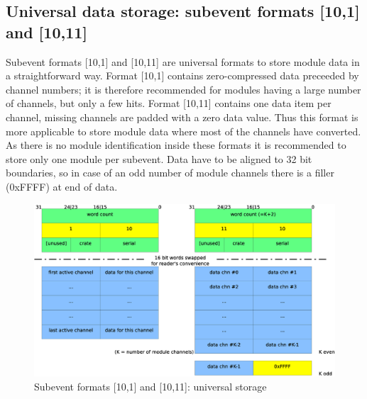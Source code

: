\documentclass[10pt]{article}
\begin{document}
\subsection{Universal data storage: subevent formats [10,1] and [10,11]}
Subevent formats [10,1] and [10,11] are universal formats to store module data in a straightforward way.
Format [10,1] contains zero-compressed data preceeded by channel numbers; it is therefore recommended for
modules having a large number of channels, but only a few hits. Format [10,11] contains one data item per channel,
missing channels are padded with a zero data value. Thus this format is more applicable to store module data
where most of the channels have converted. As there is no module identification inside these formats
it is recommended to store only one module per subevent. Data have to be aligned to 32 bit boundaries, so in case of
an odd number of module channels there is a filler (0xFFFF) at end of data.
\begin{figure}[H]
\centerline{\includegraphics[width=\linewidth]{MedSevt_10_1_11}}
\caption{Subevent formats [10,1] and [10,11]: universal storage}
\label{MedSevt_10_1_11}
\end{figure}
\newpage
\end{document}
